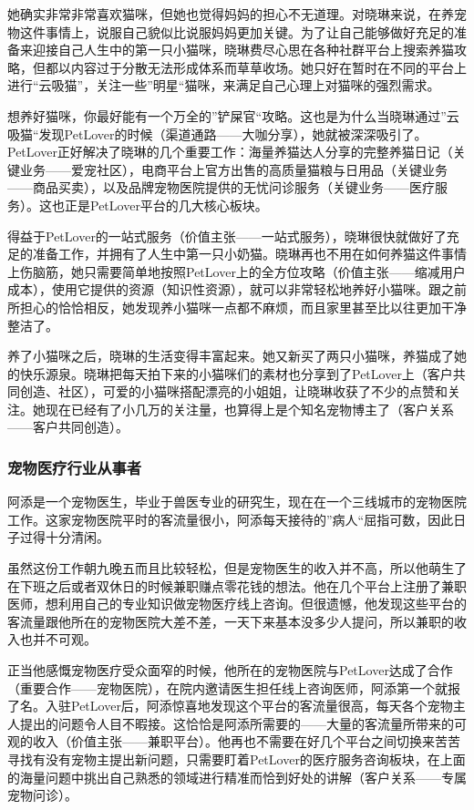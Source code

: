 \documentclass[a4paper]{ctexart}
\begin{document}
她确实非常非常喜欢猫咪，但她也觉得妈妈的担心不无道理。对晓琳来说，在养宠物这件事情上，说服自己貌似比说服妈妈更加关键。为了让自己能够做好充足的准备来迎接自己人生中的第一只小猫咪，晓琳费尽心思在各种社群平台上搜索养猫攻略，但都以内容过于分散无法形成体系而草草收场。她只好在暂时在不同的平台上进行“云吸猫”，关注一些”明星“猫咪，来满足自己心理上对猫咪的强烈需求。

想养好猫咪，你最好能有一个万全的”铲屎官“攻略。这也是为什么当晓琳通过”云吸猫“发现PetLover的时候（渠道通路——大咖分享），她就被深深吸引了。PetLover正好解决了晓琳的几个重要工作：海量养猫达人分享的完整养猫日记（关键业务——爱宠社区），电商平台上官方出售的高质量猫粮与日用品（关键业务——商品买卖），以及品牌宠物医院提供的无忧问诊服务（关键业务——医疗服务）。这也正是PetLover平台的几大核心板块。

得益于PetLover的一站式服务（价值主张——一站式服务），晓琳很快就做好了充足的准备工作，并拥有了人生中第一只小奶猫。晓琳再也不用在如何养猫这件事情上伤脑筋，她只需要简单地按照PetLover上的全方位攻略（价值主张——缩减用户成本），使用它提供的资源（知识性资源），就可以非常轻松地养好小猫咪。跟之前所担心的恰恰相反，她发现养小猫咪一点都不麻烦，而且家里甚至比以往更加干净整洁了。

养了小猫咪之后，晓琳的生活变得丰富起来。她又新买了两只小猫咪，养猫成了她的快乐源泉。晓琳把每天拍下来的小猫咪们的素材也分享到了PetLover上（客户共同创造、社区），可爱的小猫咪搭配漂亮的小姐姐，让晓琳收获了不少的点赞和关注。她现在已经有了小几万的关注量，也算得上是个知名宠物博主了（客户关系——客户共同创造）。
\subsubsection{宠物医疗行业从事者}
阿添是一个宠物医生，毕业于兽医专业的研究生，现在在一个三线城市的宠物医院工作。这家宠物医院平时的客流量很小，阿添每天接待的”病人“屈指可数，因此日子过得十分清闲。

虽然这份工作朝九晚五而且比较轻松，但是宠物医生的收入并不高，所以他萌生了在下班之后或者双休日的时候兼职赚点零花钱的想法。他在几个平台上注册了兼职医师，想利用自己的专业知识做宠物医疗线上咨询。但很遗憾，他发现这些平台的客流量跟他所在的宠物医院大差不差，一天下来基本没多少人提问，所以兼职的收入也并不可观。

正当他感慨宠物医疗受众面窄的时候，他所在的宠物医院与PetLover达成了合作（重要合作——宠物医院），在院内邀请医生担任线上咨询医师，阿添第一个就报了名。入驻PetLover后，阿添惊喜地发现这个平台的客流量很高，每天各个宠物主人提出的问题令人目不暇接。这恰恰是阿添所需要的——大量的客流量所带来的可观的收入（价值主张——兼职平台）。他再也不需要在好几个平台之间切换来苦苦寻找有没有宠物主提出新问题，只需要盯着PetLover的医疗服务咨询板块，在上面的海量问题中挑出自己熟悉的领域进行精准而恰到好处的讲解（客户关系——专属宠物问诊）。
\end{document}
